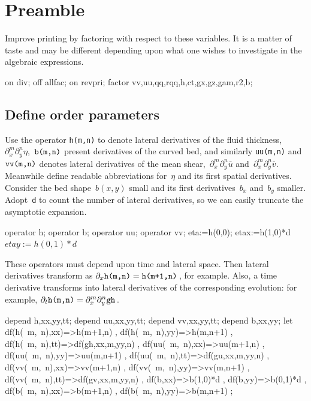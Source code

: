 \documentclass[12pt,a5paper]{article}
\newcommand{\uu}{{\bar u}}
\newcommand{\vv}{{\bar v}}
\begin{document}
\section{Preamble}

Improve printing by factoring with respect to these variables.  It is
a matter of taste and may be different depending upon what one wishes
to investigate in the algebraic expressions.

\begin{reduce}
on div; off allfac; on revpri; 
factor vv,uu,qq,rqq,h,ct,gx,gz,gam,r2,b;
\end{reduce}

\subsection{Define order parameters}

Use the operator \verb|h(m,n)| to denote lateral derivatives of the
fluid thickness,~$\partial_x^m\partial_y^n\eta$,~$\verb|b(m,n)|$ present derivatives of the curved bed, and similarly \verb|uu(m,n)| and~$\verb|vv(m,n)|$ denotes
lateral derivatives of the mean shear,~$\partial_x^m\partial_y^n\uu$ and~$\partial_x^m\partial_y^n\vv$.  Meanwhile define readable abbreviations for~$\eta$ and its first spatial
derivatives. Consider the bed shape~$b(x,y)$ small and its first derivatives~$b_x$ and~$b_y$ smaller. Adopt~\verb|d| to count the number of lateral
 derivatives, so we can easily truncate the asymptotic expansion.

\begin{reduce}
operator h; operator b; operator uu; operator vv;
eta:=h(0,0); etax:=h(1,0)*d$ etay:=h(0,1)*d$
\end{reduce}

These operators must depend upon time and lateral space.  Then lateral
derivatives transform as $\partial_x\verb|h(m,n)|= \verb|h(m+1,n)|$\,, for
example.  Also, a time derivative transforms into lateral
derivatives of the corresponding evolution: for example,
$\partial_t\verb|h(m,n)|= \partial_x^m\partial_y^n\verb|gh|$\,. 

\begin{reduce}
depend h,xx,yy,tt; 
depend uu,xx,yy,tt;
depend vv,xx,yy,tt;
depend b,xx,yy;
let{ df(h(~m,~n),xx)=>h(m+1,n)
    , df(h(~m,~n),yy)=>h(m,n+1)
    , df(h(~m,~n),tt)=>df(gh,xx,m,yy,n)
    , df(uu(~m,~n),xx)=>uu(m+1,n)
    , df(uu(~m,~n),yy)=>uu(m,n+1)
    , df(uu(~m,~n),tt)=>df(gu,xx,m,yy,n)
    , df(vv(~m,~n),xx)=>vv(m+1,n)
    , df(vv(~m,~n),yy)=>vv(m,n+1)
    , df(vv(~m,~n),tt)=>df(gv,xx,m,yy,n) 
    , df(b,xx)=>b(1,0)*d
    , df(b,yy)=>b(0,1)*d
    , df(b(~m,~n),xx)=>b(m+1,n)
    , df(b(~m,~n),yy)=>b(m,n+1)  
 };
\end{reduce}
\end{document}
